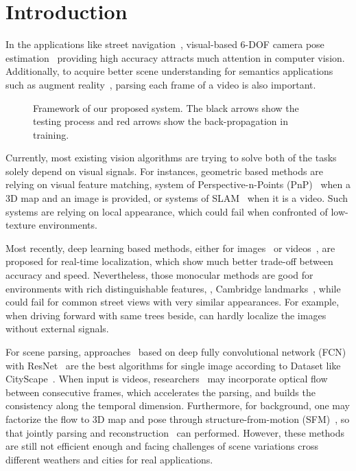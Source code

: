 \section{Introduction}
\label{sec:introduction}
In the applications like street navigation~\cite{ohno2003outdoor}, visual-based 6-DOF camera pose estimation~\cite{campbell2017globally,moreno2008pose,Kendall_2015_ICCV,coskun2017long} providing high accuracy attracts much attention in computer vision.
Additionally, to acquire better scene understanding for semantics applications such as augment reality~\cite{DBLP:journals/corr/abs-1708-05006}, parsing each frame of a video is also important.

\begin{figure*}[t]
\fbox{\rule{0pt}{2in} \rule{.9\linewidth}{0pt}}
   \caption{Framework of our proposed system. The black arrows show the testing process and red arrows show the back-propagation in training.}
\label{fig:framework}
\end{figure*}

Currently, most existing vision algorithms are trying to solve both of the tasks solely depend on visual signals.
For instances, geometric based methods are relying on visual feature matching, \eg system of Perspective-n-Points (PnP)~\cite{haralick1994review,kneip2014upnp,campbell2017globally} when a 3D map and an image is provided, or systems of SLAM~\cite{engel2014lsd,mur2015orb,NewcombeLD11} when it is a video. Such systems are relying on local appearance, which could fail when confronted of low-texture environments.

Most recently, deep learning based methods, \eg either for images~\cite{Kendall_2015_ICCV} or videos~\cite{DBLP:journals/corr/ClarkWMTW17}, are proposed for real-time localization, which show much better trade-off between accuracy and speed.
Nevertheless, those monocular methods are good for environments with rich distinguishable features, \eg, Cambridge landmarks~\cite{Kendall_2015_ICCV}, while could fail for common street views with very similar appearances. For example, when driving forward with same trees beside, can hardly localize the images without external signals.

For scene parsing, approaches~\cite{ZhaoSQWJ16,ChenPSA17} based on deep fully convolutional network (FCN) with ResNet~\cite{HeZRS15} are the best algorithms for single image according to Dataset like CityScape~\cite{Cordts2016Cityscapes}. When input is videos, researchers~\cite{kundu2016feature,zhu2016deep} may incorporate optical flow between consecutive frames, which accelerates the parsing, and builds the consistency along the temporal dimension. Furthermore, for background, one may factorize the flow to 3D map and pose through structure-from-motion (SFM)~\cite{wu2011visualsfm}, so that jointly parsing and reconstruction~\cite{kundu2014joint} can performed. However, these methods are still not efficient enough and facing challenges of scene variations cross different weathers and cities for real applications.

